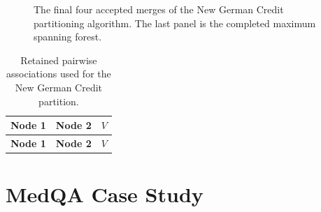 \begin{figure}[p]
  \centering
  \begin{minipage}[t]{0.49\textwidth}\centering
  \end{minipage}\hfill
  \begin{minipage}[t]{0.49\textwidth}\centering
  \end{minipage}

  \vspace{1em}
  \begin{minipage}[t]{0.49\textwidth}\centering
  \end{minipage}\hfill
  \begin{minipage}[t]{0.49\textwidth}\centering
  \end{minipage}
  \caption{The final four accepted merges of the New German Credit partitioning algorithm. The last panel is the completed maximum spanning forest.}
  \label{fig:credit-grouping-steps-b}
\end{figure}
\FloatBarrier

\begingroup
\small
\newcommand{\CreditNode}[5]{%
  \expandafter\def\csname CreditAppendixNodeLabel@#1\endcsname{#2}%
}
\newcommand{\CreditEdge}[5]{}

\renewcommand{\CreditNode}[5]{}
\renewcommand{\CreditEdge}[5]{%
  \csname CreditAppendixNodeLabel@#1\endcsname &
  \csname CreditAppendixNodeLabel@#2\endcsname & #3\tabularnewline
}
\begin{longtable}{@{}p{}p{}>{\raggedleft\arraybackslash}p{}@{}}
  \caption{Retained pairwise associations used for the New German Credit partition.}
  \label{tab:credit-associations}\\
  \hline
  \textbf{Node 1} & \textbf{Node 2} & \textbf{$V$}\\
  \hline
  \endfirsthead
  \hline
  \textbf{Node 1} & \textbf{Node 2} & \textbf{$V$}\\
  \hline
  \endhead
  
\end{longtable}
\endgroup
\clearpage

\section{MedQA Case Study}
\label{app:rq5-oracle-partition}

